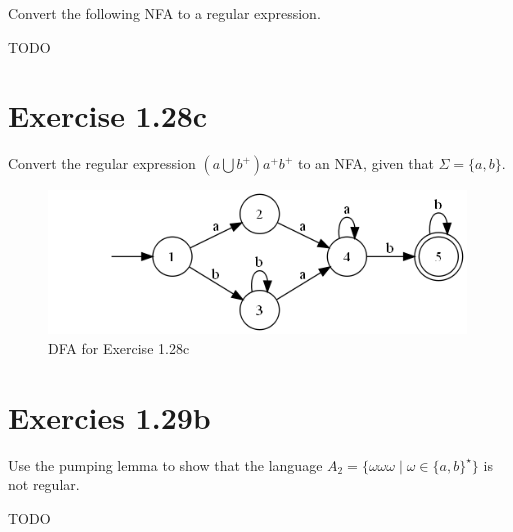 \documentclass{article}
\newcommand{\union}{\bigcup}
\newcommand{\where}{\mid}
\begin{document}
Convert the following NFA to a regular expression.

TODO

\section{Exercise 1.28c}

Convert the regular expression $(a \union b^+) a^+ b^+$ to an NFA, given that
$\Sigma = \{a, b\}$.

\begin{figure}[h!]
	\centering
	\includegraphics[height=1.5in]{1_28.png}
	\caption{DFA for Exercise 1.28c}
\end{figure}

\section{Exercies 1.29b}

Use the pumping lemma to show that the language $A_2 = \{ \omega \omega \omega
\where \omega \in \{a, b\}^\star \}$ is not regular.

TODO
\end{document}
